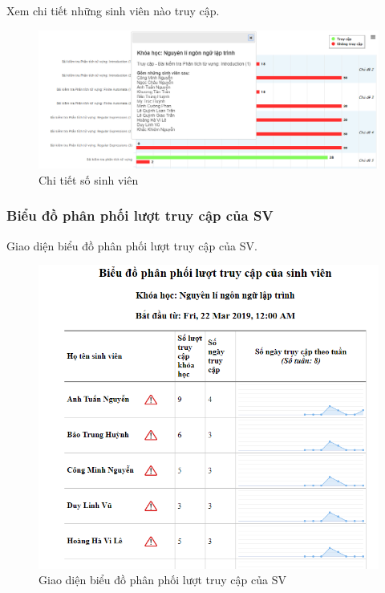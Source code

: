 \vskip 5cm
Xem chi tiết những sinh viên nào truy cập.

\begin{center}
	\begin{figure}[htp]
		\begin{center}
			\includegraphics[width=1\linewidth]{img/28}
		\end{center}
		\caption{Chi tiết số sinh viên}
		\label{refhinh60}
	\end{figure}
\end{center}

\newpage
\subsubsection*{Biểu đồ phân phối lượt truy cập của SV}

Giao diện biểu đồ phân phối lượt truy cập của SV.

\begin{center}
	\begin{figure}[htp]
		\begin{center}
			\includegraphics[width=1\linewidth]{img/29}
		\end{center}
		\caption{Giao diện biểu đồ phân phối lượt truy cập của SV}
		\label{refhinh61}
	\end{figure}
\end{center}

